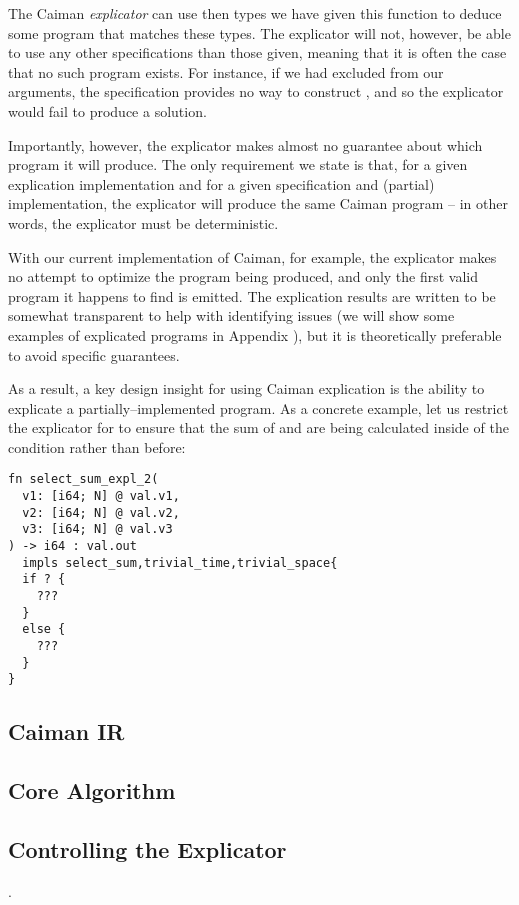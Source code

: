 The Caiman \emph{explicator} can use then types we have given this function to deduce some program that matches these types.  The explicator will not, however, be able to use any other specifications than those given, meaning that it is often the case that no such program exists.  For instance, if we had excluded  from our arguments, the  specification provides no way to construct , and so the explicator would fail to produce a solution.

Importantly, however, the explicator makes almost no guarantee about which program it will produce.  The only requirement we state is that, for a given explication implementation and for a given specification and (partial) implementation, the explicator will produce the same Caiman program -- in other words, the explicator must be deterministic.  

With our current implementation of Caiman, for example, the explicator makes no attempt to optimize the program being produced, and only the first valid program it happens to find is emitted.  The explication results are written to be somewhat transparent to help with identifying issues (we will show some examples of explicated programs in Appendix ), but it is theoretically preferable to avoid specific guarantees.

As a result, a key design insight for using Caiman explication is the ability to explicate a partially--implemented program.  As a concrete example, let us restrict the explicator for  to ensure that the sum of  and  are being calculated inside of the condition rather than before:
%
\begin{lstlisting}
fn select_sum_expl_2(
  v1: [i64; N] @ val.v1,
  v2: [i64; N] @ val.v2,
  v3: [i64; N] @ val.v3
) -> i64 : val.out 
  impls select_sum,trivial_time,trivial_space{
  if ? {
    ???
  }
  else {
    ???
  }
}
\end{lstlisting}
%


\subsection{Caiman IR}
\label{subsec:ir}

\subsection{Core Algorithm}

\subsection{Controlling the Explicator}
\label{subsec:control}.

